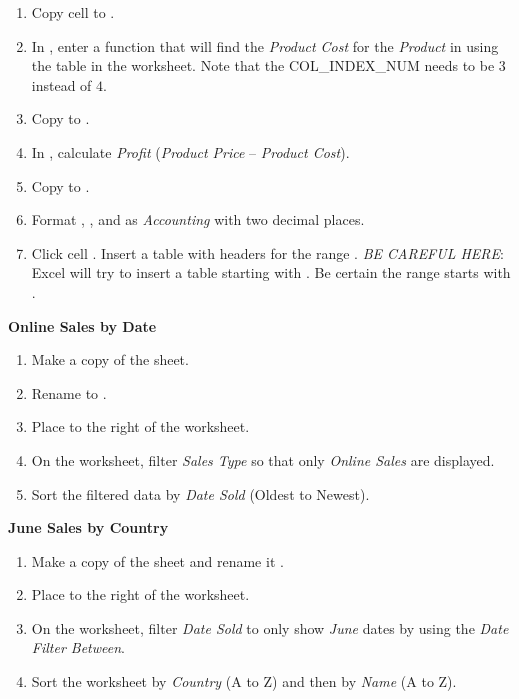 \begin{enumerate}[resume]
	\item Copy cell  to . 
	\item In , enter a  function that will find the \textit{Product Cost} for the \textit{Product} in  using the table in the  worksheet. Note that the COL\_INDEX\_NUM needs to be $ 3 $ instead of $ 4 $. 
	\item Copy  to .
	\item In , calculate \textit{Profit} (\textit{Product Price} $ – $ \textit{Product Cost}).
	\item Copy  to .
	\item Format , , and  as \textit{Accounting} with two decimal places.
	\item Click cell . Insert a table with headers for the range . \textit{BE CAREFUL HERE}: Excel will try to insert a table starting with . Be certain the range starts with .
\end{enumerate}

\noindent
\textbf{Online Sales by Date}

\begin{enumerate}[resume]
	\item Make a copy of the  sheet.
	\item Rename  to . \item Place  to the right of the  worksheet. 
	\item On the  worksheet, filter \textit{Sales Type} so that only \textit{Online Sales} are displayed. 
	\item Sort the filtered data by \textit{Date Sold} (Oldest to Newest).
\end{enumerate}

\noindent
\textbf{June Sales by Country}

\begin{enumerate}[resume]
	\item Make a copy of the  sheet and rename it . 
	\item Place  to the right of the  worksheet. 
	\item On the  worksheet, filter \textit{Date Sold} to only show \textit{June} dates by using the \textit{Date Filter Between}. 
	\item Sort the worksheet by \textit{Country} (A to Z) and then by \textit{Name} (A to Z).
\end{enumerate}

